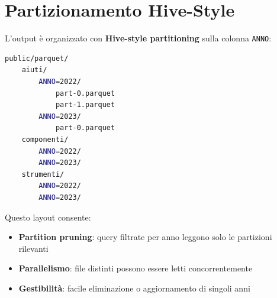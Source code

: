 \section{Partizionamento Hive-Style}

L'output è organizzato con \textbf{Hive-style partitioning} sulla colonna \texttt{ANNO}:

\begin{lstlisting}[language=bash, caption=Struttura directory output]
public/parquet/
    aiuti/
        ANNO=2022/
            part-0.parquet
            part-1.parquet
        ANNO=2023/
            part-0.parquet
    componenti/
        ANNO=2022/
        ANNO=2023/
    strumenti/
        ANNO=2022/
        ANNO=2023/
\end{lstlisting}

Questo layout consente:
\begin{itemize}
    \item \textbf{Partition pruning}: query filtrate per anno leggono solo le partizioni rilevanti
    \item \textbf{Parallelismo}: file distinti possono essere letti concorrentemente
    \item \textbf{Gestibilità}: facile eliminazione o aggiornamento di singoli anni
\end{itemize}
